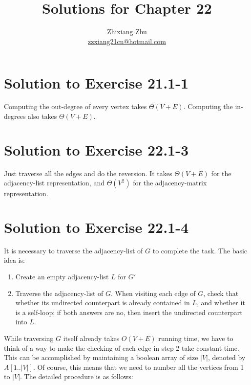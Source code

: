 \documentclass[a4paper, fleqn]{article}
\title{Solutions for Chapter 22}
\author{Zhixiang Zhu  \\\href{mailto:zzxiang21cn@hotmail.com}{zzxiang21cn@hotmail.com}}
\begin{document}
\maketitle

\section*{Solution to Exercise 21.1-1}

Computing the out-degree of every vertex takes $\Theta(V + E)$. Computing the in-degrees also takes $\Theta(V + E)$.


\section*{Solution to Exercise 22.1-3}

Just traverse all the edges and do the reversion. It takes $\Theta(V + E)$ for the adjacency-list representation, and $\Theta(V^2)$ for the adjacency-matrix representation.


\section*{Solution to Exercise 22.1-4}

It is necessary to traverse the adjacency-list of $G$ to complete the task. The basic idea is:

\begin{enumerate}

\item  %

Create an empty adjacency-list $L$ for $G'$

\item  %

Traverse the adjacency-list of $G$. When visiting each edge of $G$, check that whether its undirected counterpart is already contained in $L$, and whether it is a self-loop; if both answers are no, then insert the undirected counterpart into $L$.

\end{enumerate}

While traversing $G$ itself already takes $O(V + E)$ running time, we have to think of a way to make the checking of each edge in step 2 take constant time. This can be accomplished by maintaining a boolean array of size $|V|$, denoted by $A[1..|V|]$. Of course, this means that we need to number all the vertices from 1 to $|V|$. The detailed procedure is as follows:
\end{document}
